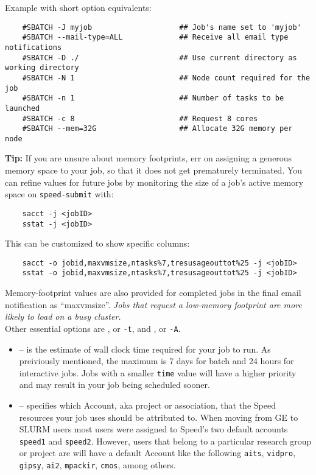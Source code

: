 \noindent Example with short option equivalents:
\begin{verbatim}
    #SBATCH -J myjob                    ## Job's name set to 'myjob'
    #SBATCH --mail-type=ALL             ## Receive all email type notifications
    #SBATCH -D ./                       ## Use current directory as working directory
    #SBATCH -N 1                        ## Node count required for the job
    #SBATCH -n 1                        ## Number of tasks to be launched
    #SBATCH -c 8                        ## Request 8 cores
    #SBATCH --mem=32G                   ## Allocate 32G memory per node 
\end{verbatim}

\noindent \textbf{Tip:} If you are unsure about memory footprints, err on assigning a generous
memory space to your job, so that it does not get prematurely terminated.
You can refine  values for future jobs by monitoring the size of a job's active
memory space on \texttt{speed-submit} with:

\begin{verbatim}
    sacct -j <jobID>
    sstat -j <jobID>
\end{verbatim}

\noindent This can be customized to show specific columns:

\begin{verbatim}
    sacct -o jobid,maxvmsize,ntasks%7,tresusageouttot%25 -j <jobID>
    sstat -o jobid,maxvmsize,ntasks%7,tresusageouttot%25 -j <jobID>
\end{verbatim}

\noindent Memory-footprint values are also provided for completed jobs in the final
email notification as ``maxvmsize''.
\emph{Jobs that request a low-memory footprint are more likely to load on a busy
cluster.}\\

\noindent Other essential options are , or \verb|-t|, and , or \verb|-A|.
\begin{itemize}
    \item {} -- is the estimate of wall clock time required for your job to run. 
    As preiviously mentioned, the maximum is 7 days for batch and 24 hours for interactive jobs. 
    Jobs with a smaller \texttt{time} value will have a higher priority and may result in your job being scheduled sooner. 

    \item {} -- specifies which Account, aka project or association, 
    that the Speed resources your job uses should be attributed to. When moving from 
    GE to SLURM users most users were assigned to Speed's two default accounts 
    \texttt{speed1} and \texttt{speed2}. However, users that belong to a particular research
    group or project are will have a default Account like the following
    \texttt{aits},
    \texttt{vidpro},
    \texttt{gipsy},
    \texttt{ai2},
    \texttt{mpackir},
    \texttt{cmos}, among others.
\end{itemize}